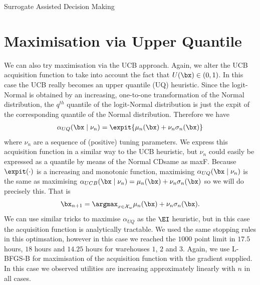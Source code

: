 \begin{chapter}{Surrogate Assisted Decision Making \label{Chap:optimisation}}
\section{Maximisation via Upper Quantile}

We can also try maximisation via the UCB approach. Again, we alter the UCB acquisition function to take into account the fact that $U(\bx) \in (0,1)$. In this case the UCB really becomes an upper quantile (UQ) heuristic. Since the logit-Normal is obtained by an increasing, one-to-one transformation of the Normal distribution, the $q^{th}$ quantile of the logit-Normal distribution is just the expit of the corresponding quantile of the Normal distribution.  Therefore we have
\begin{align}
  \alpha_{UQ}(\bx \mid \nu_n ) = \expit\{ \mu_n(\bx) + \nu_n \sigma_n(\bx) \}
\end{align}
where $\nu_n$ are a sequence of (positive) tuning parameters. We express this acquisition function in a similar way to the UCB heuristic, but $\nu_n$ could easily be expressed as a quantile by means of the Normal CDsame as maxF. Because $\expit(\cdot)$ is a increasing and monotonic function, maximising $\alpha_{UQ}(\bx \mid \nu_n)$ is the same as maximising $\alpha_{UCB}(\bx \mid \nu_n) = \mu_n(\bx) + \nu_n \sigma_n(\bx)$ so we will do precisely this. That is
\begin{equation}
  \bx_{n+1} = \argmax_{x \in \mathcal{X}_w} \mu_n(\bx) + \nu_n \sigma_n(\bx).
\end{equation}
 We can use similar tricks to maximise $\alpha_{UQ}$ as the $\EI$ heuristic, but in this case the acquisition function is analytically tractable. We used the same stopping rules in this optimsation, however in this case we reached the $1000$ point limit in $17.5$ hours, $18$ hours and $14.25$ hours for warehouses $1$, $2$ and $3$. Again, we use L-BFGS-B for maximisation of the acquisition function with the gradient supplied. In this case we observed utilities are increasing approximately linearly with $n$ in all cases.



\end{chapter}
